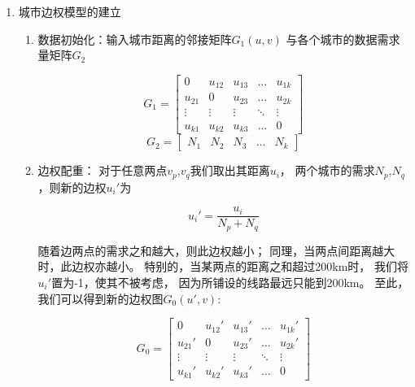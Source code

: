 \documentclass[UTF8,12pt]{ctexart}
\begin{document}
\begin{enumerate}
            \item 城市边权模型的建立
                \begin{enumerate}
                    \item 数据初始化：输入城市距离的邻接矩阵$G_1(u,v)$
                        与各个城市的数据需求量矩阵$G_2$
                        \begin{large}
                            $$G_1 = \begin{bmatrix}
                            0 & u_{12} &u_{13}&\ldots&u_{1k}\\
                            u_{21} & 0 &u_{23}&\ldots&u_{2k}\\
                            \vdots &  \vdots &   \vdots   &  \ddots    &\vdots\\
                            u_{k1} &u_{k2}& u_{k3}& \ldots  &0
                            \end{bmatrix}$$
                            $$G_2=\begin{bmatrix} N_1&N_2&N_3 &\ldots &N_k\end{bmatrix}$$
                        \end{large}                    
                    \item 边权配重：
                        对于任意两点$v_p$,$v_q$我们取出其距离$u_i$，
                        两个城市的需求$N_p$,$N_q$，则新的边权$u_{i}'$为
                        \begin{large}
                            $$u_{i}' = \frac {u_i}{N_p+N_q}$$
                        \end{large}
                        随着边两点的需求之和越大，则此边权越小；
                        同理，当两点间距离越大时，此边权亦越小。
                        特别的，当某两点的距离之和超过200km时，
                        我们将$u_{i}'$置为-1，使其不被考虑，
                        因为所铺设的线路最远只能到200km。
                        至此，我们可以得到新的边权图$G_{0}(u',v)$:
                        \begin{large}
                            $$G_0 = \begin{bmatrix}
                            0 & u_{12}' &u_{13} '&\ldots&u_{1k}'\\
                            u_{21}' & 0 &u_{23}'&\ldots&u_{2k}'\\
                            \vdots &\vdots &\vdots&\ddots&\vdots\\
                            u_{k1}' &u_{k2}'& u_{k3}'& \ldots  &0
                            \end{bmatrix}$$
                        \end{large}
                \end{enumerate}
        \end{enumerate}
    
\end{document}
